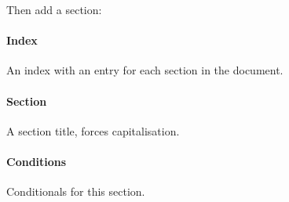 Then add a section:

\begin{Shaded}
\begin{Highlighting}[]
\NormalTok{\#section("Cup of Tea preparation")[}
\NormalTok{]}
\end{Highlighting}
\end{Shaded}

\paragraph{Index}\label{index}

An index with an entry for each section in the document.

\begin{Shaded}
\begin{Highlighting}[]
\end{Highlighting}
\end{Shaded}

\paragraph{Section}\label{section}

A section title, forces capitalisation.

\begin{Shaded}
\begin{Highlighting}[]
\NormalTok{\#section("Cup of Tea preparation")[}
\NormalTok{]}
\end{Highlighting}
\end{Shaded}

\paragraph{Conditions}\label{conditions}

Conditionals for this section.

\begin{Shaded}
\begin{Highlighting}[]
\NormalTok{\#condition[}
\NormalTok{]}
\end{Highlighting}
\end{Shaded}

